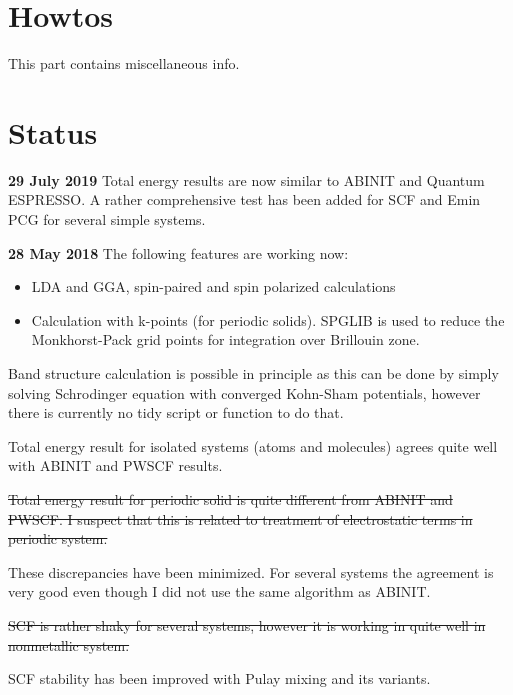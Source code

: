 \documentclass[a4paper,10pt]{article}
\begin{document}
















\appendix
\section{Howtos}

This part contains miscellaneous info.




\section*{Status}

\textbf{29 July 2019} Total energy results are now similar to ABINIT
and Quantum ESPRESSO. A rather comprehensive test has been added
for SCF and Emin PCG for several simple systems.


\textbf{28 May 2018} The following features are working now:
\begin{itemize}
\item LDA and GGA, spin-paired and spin polarized calculations
\item Calculation with k-points (for periodic solids).
  \textsf{SPGLIB} is used to reduce the Monkhorst-Pack grid points
  for integration over Brillouin zone.
\end{itemize}

Band structure calculation is possible in principle as this can be
done by simply solving
Schrodinger equation with converged Kohn-Sham potentials, however there
is currently no tidy script or function to do that.

Total energy result for isolated systems (atoms and molecules) agrees quite
well with ABINIT and PWSCF results.

\sout{Total energy result for periodic solid is quite different from ABINIT and PWSCF.
I suspect that this is related to treatment of electrostatic terms in periodic system.}

These discrepancies have been minimized. For several systems the agreement is very good
even though I did not use the same algorithm as ABINIT.

\sout{SCF is rather shaky for several systems, however it is working in quite well in nonmetallic
system.}

SCF stability has been improved with Pulay mixing and its variants.





\end{document}
